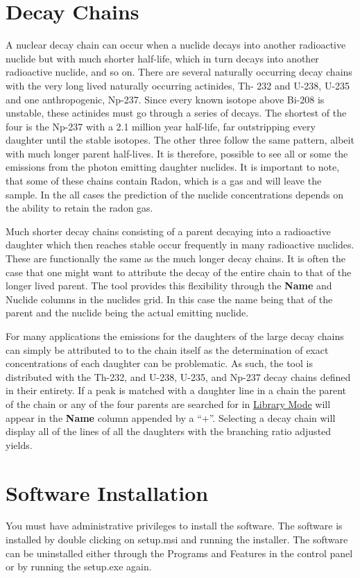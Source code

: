 \documentclass[12pt,report,justified]{SANDreport}
\begin{document}
   \chapter{Decay Chains} \label{sec:decay_chain}
A nuclear decay chain can occur when a nuclide decays into another radioactive nuclide but with
much shorter half-life, which in turn decays into another radioactive nuclide, and so on. There are
several naturally occurring decay chains with the very long lived naturally occurring actinides, Th-
232 and U-238, U-235 and one anthropogenic, Np-237. Since every known isotope above Bi-208 is
unstable, these actinides must go through a series of decays. The shortest of the four is the Np-237
with a 2.1 million year half-life, far outstripping every daughter until the stable isotopes. The other
three follow the same pattern, albeit with much longer parent half-lives. It is therefore, possible to
see all or some the emissions from the photon emitting daughter nuclides. It is important to note,
that some of these chains contain Radon, which is a gas and will leave the sample. In the all cases
the prediction of the nuclide concentrations depends on the ability to retain the radon gas.

Much shorter decay chains consisting of a parent decaying into a radioactive daughter which then
reaches stable occur frequently in many radioactive nuclides. These are functionally the same as
the much longer decay chains. It is often the case that one might want to attribute the decay of the
entire chain to that of the longer lived parent. The tool provides this flexibility through the \textbf{Name}
and Nuclide columns in the nuclides grid. In this case the name being that of the parent and the
nuclide being the actual emitting nuclide.

For many applications the emissions for the daughters of the large decay chains can simply be
attributed to to the chain itself as the determination of exact concentrations of each daughter can
be problematic. As such, the tool is distributed with the Th-232, and U-238, U-235, and Np-237
decay chains defined in their entirety. If a peak is matched with a daughter line in a chain the parent
of the chain or any of the four parents are searched for in \hyperref[sec:libMode]{Library Mode} will 
appear in the \textbf{Name} column appended by a “+”. Selecting a decay chain will display all of the 
lines of all the daughters with the branching ratio adjusted yields.

   \chapter{Software Installation} \label{sec:install}
You must have administrative privileges to install the software. The software is installed by double
clicking on setup.msi and running the installer. The software can be uninstalled either through the
Programs and Features in the control panel or by running the setup.exe again.
        {}


    
\end{document}
